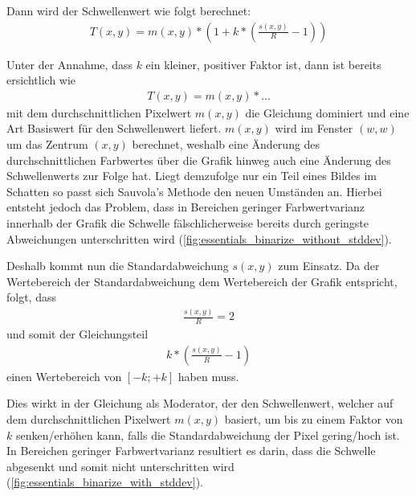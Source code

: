 Dann wird der Schwellenwert wie folgt berechnet:
\begin{gather}
    T(x,y) = m(x,y) * \left(1 + k * \left(\frac{s(x,y)}{R} - 1\right)\right)
\end{gather}

Unter der Annahme, dass \(k\) ein kleiner, positiver Faktor ist, dann ist bereits ersichtlich wie
\begin{gather*}
    T(x,y) = m(x,y) * \ldots
\end{gather*}
mit dem durchschnittlichen Pixelwert \(m(x,y)\) die Gleichung dominiert und eine Art Basiswert für den Schwellenwert liefert.
\(m(x,y)\) wird im Fenster \((w,w)\) um das Zentrum \((x,y)\) berechnet, weshalb eine Änderung des durchschnittlichen Farbwertes über die Grafik hinweg auch eine Änderung des Schwellenwerts zur Folge hat.
Liegt demzufolge nur ein Teil eines Bildes im Schatten so passt sich Sauvola's Methode den neuen Umständen an.
Hierbei entsteht jedoch das Problem, dass in Bereichen geringer Farbwertvarianz innerhalb der Grafik die Schwelle fälschlicherweise bereits durch geringste Abweichungen unterschritten wird (\autoref{fig:essentials_binarize_without_stddev}).

Deshalb kommt nun die Standardabweichung \(s(x,y)\) zum Einsatz.
Da der Wertebereich der Standardabweichung dem Wertebereich der Grafik entspricht, folgt, dass
\begin{gather*}
    \frac{s(x,y)}{R} = 2
\end{gather*}
und somit der Gleichungsteil
\begin{gather*}
    k * \left(\frac{s(x,y)}{R} - 1\right)
\end{gather*}
einen Wertebereich von \([-k;+k]\) haben muss.

Dies wirkt in der Gleichung als Moderator, der den Schwellenwert, welcher auf dem durchschnittlichen Pixelwert \(m(x,y)\) basiert, um bis zu einem Faktor von \(k\) senken/erhöhen kann, falls die Standardabweichung der Pixel gering/hoch ist.
In Bereichen geringer Farbwertvarianz resultiert es darin, dass die Schwelle abgesenkt und somit nicht unterschritten wird (\autoref{fig:essentials_binarize_with_stddev}).

